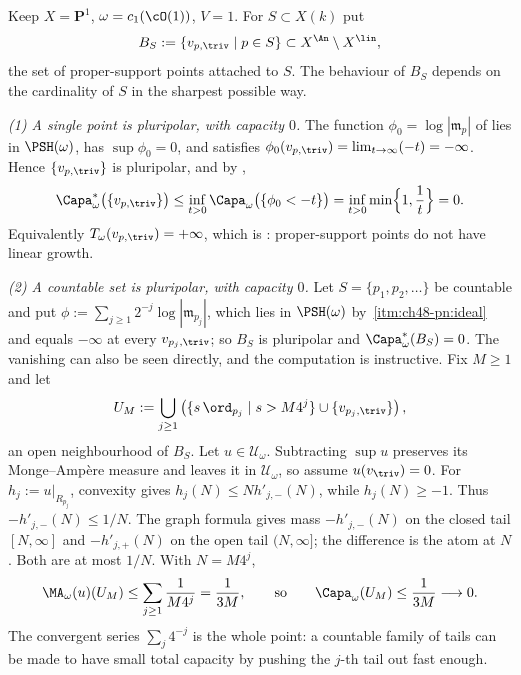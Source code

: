\begin{example}
\label{ex:ch48-proper-support-capacity}
Keep $X=\mathbf P^1$, $\omega=c_1(\cO(1))$, $V=1$.  For
$S\subset X(k)$ put
\[
 B_S:=\{v_{p,\triv}\mid p\in S\}\subset X^{\An}\setminus X^{\lin},
\]
the set of proper-support points attached to $S$.  The behaviour of
$B_S$ depends on the cardinality of $S$ in the sharpest possible way.

\emph{(1) A single point is pluripolar, with capacity $0$.}  The function
$\phi_0=\log|\mathfrak m_p|$ of  lies in
$\PSH(\omega)$, has $\sup\phi_0=0$, and satisfies
$\phi_0(v_{p,\triv})=\lim_{t\to\infty}(-t)=-\infty$.  Hence
$\{v_{p,\triv}\}$ is pluripolar, and by
,
\[
 \Capa^*_\omega\bigl(\{v_{p,\triv}\}\bigr)
 \le\inf_{t>0}\Capa_\omega\bigl(\{\phi_0<-t\}\bigr)
 =\inf_{t>0}\min\Bigl\{1,\frac1t\Bigr\}=0 .
\]
Equivalently $T_\omega(v_{p,\triv})=+\infty$, which is
: proper-support points do not have
linear growth.

\emph{(2) A countable set is pluripolar, with capacity $0$.}  Let
$S=\{p_1,p_2,\dots\}$ be countable and put
$\phi:=\sum_{j\ge1}2^{-j}\log|\mathfrak m_{p_j}|$, which lies in
$\PSH(\omega)$ by
\,\cref{itm:ch48-pn:ideal} and equals
$-\infty$ at every $v_{p_j,\triv}$; so $B_S$ is pluripolar and
$\Capa^*_\omega(B_S)=0$.  The vanishing can also be seen directly, and
the computation is instructive.  Fix $M\ge1$ and let
\[
 U_M:=\bigcup_{j\ge1}\left(
       \{s\,\ord_{p_j}\mid s>M4^j\}\cup\{v_{p_j,\triv}\}\right),
\]
an open neighbourhood of $B_S$. Let $u\in\mathcal U_\omega$.
Subtracting $\sup u$ preserves its Monge--Amp\`ere measure and leaves
it in $\mathcal U_\omega$, so assume $u(v_{\triv})=0$.
For $h_j:=u|_{R_{p_j}}$, convexity gives
$h_j(N)\le N h'_{j,-}(N)$, while $h_j(N)\ge-1$.
Thus $-h'_{j,-}(N)\le1/N$. The graph formula gives mass
$-h'_{j,-}(N)$ on the closed tail $[N,\infty]$ and
$-h'_{j,+}(N)$ on the open tail $(N,\infty]$; the difference is
the atom at $N$. Both are at most $1/N$.
With $N=M4^j$,
\[
 \MA_\omega(u)(U_M)\le\sum_{j\ge1}\frac1{M4^j}=\frac1{3M},
 \qquad\text{so}\qquad
 \Capa_\omega(U_M)\le\frac1{3M}\longrightarrow0 .
\]
The convergent series $\sum_j4^{-j}$ is the whole point: a countable
family of tails can be made to have small total capacity by pushing the
$j$-th tail out fast enough.


\end{example}
